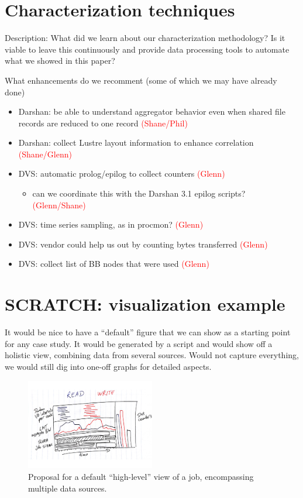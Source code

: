 \documentclass[conference,10pt,compsocconf]{IEEEtran}
\newcommand{\assign}[1]{\textcolor{red}{(#1)}}
\begin{document}
\section{Characterization techniques}

Description: What did we learn about our characterization methodology?  Is it
viable to leave this continuously and provide data processing tools to
automate what we showed in this paper?

What enhancements do we recomment (some of which we may have already done)
\begin{itemize}
\item Darshan: be able to understand aggregator behavior even when shared
file records are reduced to one record \assign{Shane/Phil}
\item Darshan: collect Lustre layout information to enhance correlation
\assign{Shane/Glenn}
\item DVS: automatic prolog/epilog to collect counters \assign{Glenn}
    \begin{itemize}
    \item can we coordinate this with the Darshan 3.1 epilog scripts?
    \assign{Glenn/Shane}
    \end{itemize}
\item DVS: time series sampling, as in procmon? \assign{Glenn}
\item DVS: vendor could help us out by counting bytes transferred
\assign{Glenn}
\item DVS: collect list of BB nodes that were used \assign{Glenn}
\end{itemize}

\section{SCRATCH: visualization example}

It would be nice to have a ``default'' figure that we can show as a starting
point for any case study.  It would be generated by a script and would show
off a holistic view, combining data from several sources.  Would not capture
everything, we would still dig into one-off graphs for detailed aspects.

\begin{figure}
\centering
\includegraphics[width=0.5\textwidth]{figs/holio-fig-sketch.pdf}
\caption{Proposal for a default ``high-level'' view of a job, encompassing
multiple data sources.}
\label{fig:holio-fig-sketch}
\end{figure}
\end{document}
